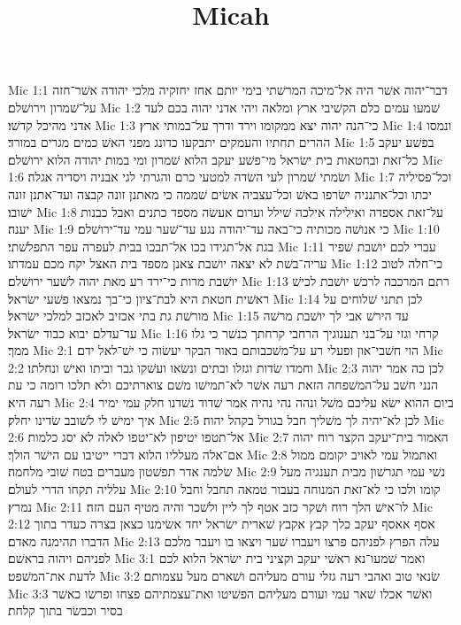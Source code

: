 

\title{Micah}

Mic 1:1  דבר־יהוה אשׁר היה אל־מיכה המרשׁתי בימי יותם אחז יחזקיה מלכי יהודה אשׁר־חזה על־שׁמרון וירושׁלם׃
Mic 1:2  שׁמעו עמים כלם הקשׁיבי ארץ ומלאה ויהי אדני יהוה בכם לעד אדני מהיכל קדשׁו׃
Mic 1:3  כי־הנה יהוה יצא ממקומו וירד ודרך על־במותי ארץ׃
Mic 1:4  ונמסו ההרים תחתיו והעמקים יתבקעו כדונג מפני האשׁ כמים מגרים במורד׃
Mic 1:5  בפשׁע יעקב כל־זאת ובחטאות בית ישׂראל מי־פשׁע יעקב הלוא שׁמרון ומי במות יהודה הלוא ירושׁלם׃
Mic 1:6  ושׂמתי שׁמרון לעי השׂדה למטעי כרם והגרתי לגי אבניה ויסדיה אגלה׃
Mic 1:7  וכל־פסיליה יכתו וכל־אתנניה ישׂרפו באשׁ וכל־עצביה אשׂים שׁממה כי מאתנן זונה קבצה ועד־אתנן זונה ישׁובו׃
Mic 1:8  על־זאת אספדה ואילילה אילכה שׁילל וערום אעשׂה מספד כתנים ואבל כבנות יענה׃
Mic 1:9  כי אנושׁה מכותיה כי־באה עד־יהודה נגע עד־שׁער עמי עד־ירושׁלם׃
Mic 1:10  בגת אל־תגידו בכו אל־תבכו בבית לעפרה עפר התפלשׁתי׃
Mic 1:11  עברי לכם יושׁבת שׁפיר עריה־בשׁת לא יצאה יושׁבת צאנן מספד בית האצל יקח מכם עמדתו׃
Mic 1:12  כי־חלה לטוב יושׁבת מרות כי־ירד רע מאת יהוה לשׁער ירושׁלם׃
Mic 1:13  רתם המרכבה לרכשׁ יושׁבת לכישׁ ראשׁית חטאת היא לבת־ציון כי־בך נמצאו פשׁעי ישׂראל׃
Mic 1:14  לכן תתני שׁלוחים על מורשׁת גת בתי אכזיב לאכזב למלכי ישׂראל׃
Mic 1:15  עד הירשׁ אבי לך יושׁבת מרשׁה עד־עדלם יבוא כבוד ישׂראל׃
Mic 1:16  קרחי וגזי על־בני תענוגיך הרחבי קרחתך כנשׁר כי גלו ממך׃
Mic 2:1  הוי חשׁבי־און ופעלי רע על־משׁכבותם באור הבקר יעשׂוה כי ישׁ־לאל ידם׃
Mic 2:2  וחמדו שׂדות וגזלו ובתים ונשׂאו ועשׁקו גבר וביתו ואישׁ ונחלתו׃
Mic 2:3  לכן כה אמר יהוה הנני חשׁב על־המשׁפחה הזאת רעה אשׁר לא־תמישׁו משׁם צוארתיכם ולא תלכו רומה כי עת רעה היא׃
Mic 2:4  ביום ההוא ישׂא עליכם משׁל ונהה נהי נהיה אמר שׁדוד נשׁדנו חלק עמי ימיר איך ימישׁ לי לשׁובב שׂדינו יחלק׃
Mic 2:5  לכן לא־יהיה לך משׁליך חבל בגורל בקהל יהוה׃
Mic 2:6  אל־תטפו יטיפון לא־יטפו לאלה לא יסג כלמות׃
Mic 2:7  האמור בית־יעקב הקצר רוח יהוה אם־אלה מעלליו הלוא דברי ייטיבו עם הישׁר הולך׃
Mic 2:8  ואתמול עמי לאויב יקומם ממול שׂלמה אדר תפשׁטון מעברים בטח שׁובי מלחמה׃
Mic 2:9  נשׁי עמי תגרשׁון מבית תענגיה מעל עלליה תקחו הדרי לעולם׃
Mic 2:10  קומו ולכו כי לא־זאת המנוחה בעבור טמאה תחבל וחבל נמרץ׃
Mic 2:11  לו־אישׁ הלך רוח ושׁקר כזב אטף לך ליין ולשׁכר והיה מטיף העם הזה׃
Mic 2:12  אסף אאסף יעקב כלך קבץ אקבץ שׁארית ישׂראל יחד אשׂימנו כצאן בצרה כעדר בתוך הדברו תהימנה מאדם׃
Mic 2:13  עלה הפרץ לפניהם פרצו ויעברו שׁער ויצאו בו ויעבר מלכם לפניהם ויהוה בראשׁם׃
Mic 3:1  ואמר שׁמעו־נא ראשׁי יעקב וקציני בית ישׂראל הלוא לכם לדעת את־המשׁפט׃
Mic 3:2  שׂנאי טוב ואהבי רעה גזלי עורם מעליהם ושׁארם מעל עצמותם׃
Mic 3:3  ואשׁר אכלו שׁאר עמי ועורם מעליהם הפשׁיטו ואת־עצמתיהם פצחו ופרשׂו כאשׁר בסיר וכבשׂר בתוך קלחת׃
